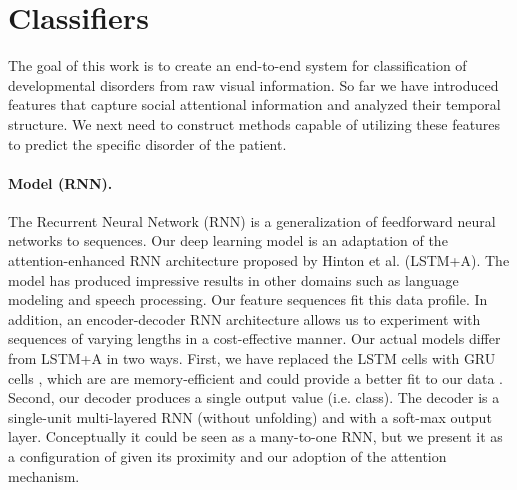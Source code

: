 \documentclass{llncs}
\begin{document}


  \vspace*{-\baselineskip}
  \section{Classifiers}
  \vspace*{-\baselineskip}

  \label{sec:classification}
  The goal of this work is to create an end-to-end system for classification of developmental disorders from raw visual information. So far we have introduced features that capture social attentional information and analyzed their temporal structure. We next need to construct methods capable of utilizing these features to predict the specific disorder of the patient.
  \vspace*{-\baselineskip}
  \paragraph{Model (RNN).} The Recurrent Neural Network (RNN) is a generalization of feedforward neural networks to sequences. Our deep learning model is an adaptation of the attention-enhanced RNN architecture proposed by Hinton et al. \cite{NIPS2015_5635} (LSTM+A). The model has produced impressive results in other domains such as language modeling and speech processing. Our feature sequences fit this data profile. In addition, an encoder-decoder RNN architecture allows us to experiment with sequences of varying lengths in a cost-effective manner. Our actual models differ from LSTM+A in two ways. First, we have replaced the LSTM cells with GRU cells \cite{Cho}, which are are memory-efficient and could provide a better fit to our data \cite{JozefowiczZS15}. Second, our decoder produces a single output value (i.e. class). The decoder is a single-unit multi-layered RNN (without unfolding) and with a soft-max output layer. Conceptually it could be seen as a many-to-one RNN, but we present it as a configuration of \cite{NIPS2015_5635} given its proximity and our adoption of the attention mechanism.
\end{document}
